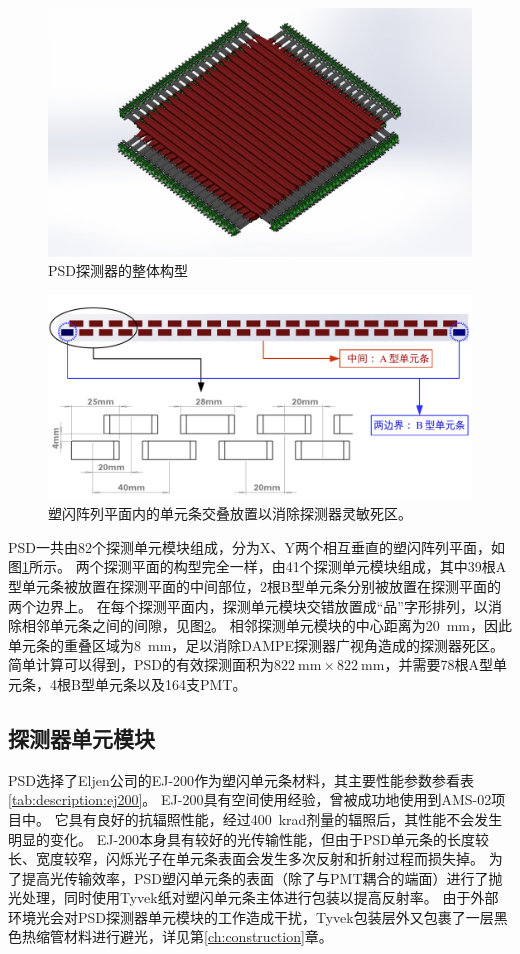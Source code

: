 \begin{figure}[h!]
	\centering
	\includegraphics[width=0.72\linewidth]{chap/description/fig/psd_detector}
	\caption{PSD探测器的整体构型}
	\label{fig:description:psd_explosion}
\end{figure}

\begin{figure}[h!]
	\centering
	\includegraphics[width=0.8\linewidth]{chap/description/fig/bars_layout}
	\caption{塑闪阵列平面内的单元条交叠放置以消除探测器灵敏死区。}
	\label{fig:description:bars_layout}
\end{figure}

PSD一共由82个探测单元模块组成，分为X、Y两个相互垂直的塑闪阵列平面，如图\ref{fig:description:psd_explosion}所示。
两个探测平面的构型完全一样，由41个探测单元模块组成，其中39根A型单元条被放置在探测平面的中间部位，2根B型单元条分别被放置在探测平面的两个边界上。
在每个探测平面内，探测单元模块交错放置成“品”字形排列，以消除相邻单元条之间的间隙，见图\ref{fig:description:bars_layout}。
相邻探测单元模块的中心距离为\SI{20}{\milli\meter}，因此单元条的重叠区域为\SI{8}{\milli\meter}，足以消除DAMPE探测器广视角造成的探测器死区。
简单计算可以得到，PSD的有效探测面积为$\SI{822}{\milli\meter}\times\SI{822}{\milli\meter}$，并需要78根A型单元条，4根B型单元条以及164支PMT。

\subsection{探测器单元模块}
PSD选择了Eljen公司的EJ-200\parencite{ej-200}作为塑闪单元条材料，其主要性能参数参看表\ref{tab:description:ej200}。
EJ-200具有空间使用经验，曾被成功地使用到AMS-02项目中。
它具有良好的抗辐照性能，经过\SI{400}{\kilo\radian}剂量的辐照后，其性能不会发生明显的变化\parencite{ams02_tof}。
EJ-200本身具有较好的光传输性能，但由于PSD单元条的长度较长、宽度较窄，闪烁光子在单元条表面会发生多次反射和折射过程而损失掉。
为了提高光传输效率，PSD塑闪单元条的表面（除了与PMT耦合的端面）进行了抛光处理，同时使用Tyvek纸对塑闪单元条主体进行包装以提高反射率。
由于外部环境光会对PSD探测器单元模块的工作造成干扰，Tyvek包装层外又包裹了一层黑色热缩管材料进行避光，详见第\ref{ch:construction}章。

